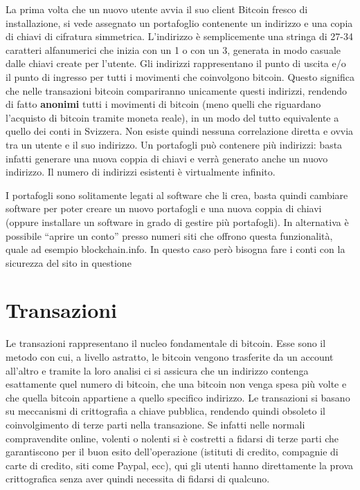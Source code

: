 La prima volta che un nuovo utente avvia il suo client Bitcoin fresco di installazione, si vede assegnato un portafoglio contenente un indirizzo e una copia di chiavi di cifratura simmetrica. L'indirizzo è semplicemente una stringa di 27-34 caratteri alfanumerici che inizia con un 1 o con un 3, generata in modo casuale dalle chiavi create per l'utente. Gli indirizzi rappresentano il punto di uscita e/o il punto di ingresso per tutti i movimenti che coinvolgono bitcoin. Questo significa che nelle transazioni bitcoin compariranno unicamente questi indirizzi, rendendo di fatto \textbf{anonimi} tutti i movimenti di bitcoin (meno quelli che riguardano l'acquisto di bitcoin tramite moneta reale), in un modo del tutto equivalente a quello dei conti in Svizzera. Non esiste quindi nessuna correlazione diretta e ovvia tra un utente e il suo indirizzo. Un portafogli può contenere più indirizzi: basta infatti generare una nuova coppia di chiavi e verrà generato anche un nuovo indirizzo. Il numero di indirizzi esistenti è virtualmente infinito.

I portafogli sono solitamente legati al software che li crea, basta quindi cambiare software per poter creare un nuovo portafogli e una nuova coppia di chiavi (oppure installare un software in grado di gestire più portafogli). In alternativa è possibile ``aprire un conto'' presso numeri siti che offrono questa funzionalità, quale ad esempio blockchain.info. In questo caso però bisogna fare i conti con la sicurezza del sito in questione

\section{Transazioni}\label{transazioni}

Le transazioni rappresentano il nucleo fondamentale di bitcoin. Esse sono il metodo con cui, a livello astratto, le bitcoin vengono trasferite da un account all'altro e tramite la loro analisi ci si assicura che un indirizzo contenga esattamente quel numero di bitcoin, che una bitcoin non venga spesa più volte e che quella bitcoin appartiene a quello specifico indirizzo. Le transazioni si basano su meccanismi di crittografia a chiave pubblica, rendendo quindi obsoleto il coinvolgimento di terze parti nella transazione. Se infatti nelle normali compravendite online, volenti o nolenti si è costretti a fidarsi di terze parti che garantiscono per il buon esito dell'operazione (istituti di credito, compagnie di carte di credito, siti come Paypal, ecc), qui gli utenti hanno direttamente la prova crittografica senza aver quindi necessita di fidarsi di qualcuno.


